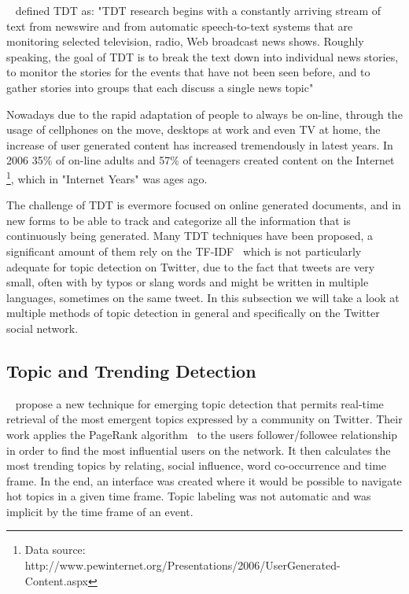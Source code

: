 ~\citet{allan2002topic} defined \ac{TDT} as: "\ac{TDT} research begins with a constantly arriving stream of text from newswire and from automatic speech-to-text systems that are monitoring selected television, radio, Web broadcast news shows. Roughly speaking, the goal of \ac{TDT} is to break the text down into individual news stories, to monitor the stories for the events that have not been seen before, and to gather stories into groups that each discuss a single news topic"

Nowadays due to the rapid adaptation of people to always be on-line, through the usage of cellphones on the move, desktops at work and even TV at home, the increase of user generated content has increased tremendously in latest years. In 2006 35\% of on-line adults and 57\% of teenagers created content on the Internet \footnote{ Data source: http://www.pewinternet.org/Presentations/2006/UserGenerated-Content.aspx}, which in "Internet Years" was ages ago. 

The challenge of \ac{TDT} is evermore focused on online generated documents, and in new forms to be able to track and categorize all the information that is continuously being generated.
Many \ac{TDT} techniques have been proposed,  a significant amount of them rely on the \ac{TF-IDF}~\cite{Baeza-Yates:1999:MIR:553876} which is not particularly adequate for topic detection on Twitter, due to the fact that tweets are very small, often with by typos or slang words and might be written in multiple languages, sometimes on the same tweet. In this subsection we will take a look at multiple methods of topic detection in general and specifically on the Twitter social network.

\subsection{Topic and Trending Detection} 
\label{sub:real_time_topic_and_trending_detection}
~\citet{Cataldi2010} propose a new technique for emerging topic detection that permits real-time retrieval of the most emergent topics expressed by a community on Twitter. Their work applies the PageRank algorithm~\cite{Pagerank1998} to the users follower/followee relationship in order to find the most influential users on the network. It then calculates the most trending topics by relating, social influence, word co-occurrence and time frame. In the end, an interface was created where it would be possible to navigate hot topics in a given time frame. Topic labeling was not automatic and was implicit by the time frame of an event.

